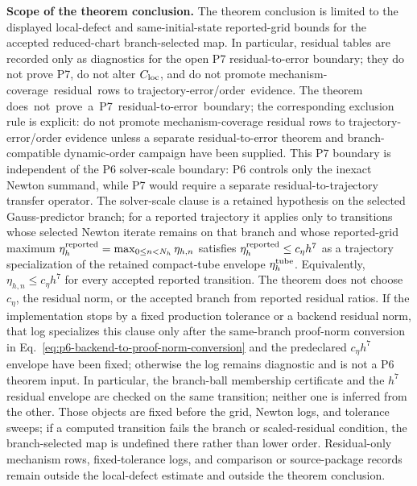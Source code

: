 \documentclass[preprint,12pt]{elsarticle}
\begin{document}
\noindent\textbf{Scope of the theorem conclusion.}
The theorem conclusion is limited to the displayed local-defect and
same-initial-state reported-grid bounds for the accepted reduced-chart
branch-selected map.
In particular, residual tables are recorded only as diagnostics for the open
P7 residual-to-error boundary; they do not
prove P7, do not alter \(C_{\rm loc}\), and do not promote
\mbox{mechanism-coverage residual rows} to \mbox{trajectory-error/order evidence}. The
theorem \mbox{does not prove a P7 residual-to-error boundary}; the
corresponding exclusion rule is explicit: do not promote
mechanism-coverage residual rows to trajectory-error/order evidence unless a
separate residual-to-error theorem and branch-compatible dynamic-order
campaign have been supplied.
This P7 boundary is independent of the P6 solver-scale boundary: P6 controls
only the inexact Newton summand, while P7 would require a separate
residual-to-trajectory transfer operator.
The solver-scale clause is a retained hypothesis on the selected Gauss-predictor
branch; for a reported trajectory it applies only to transitions whose
selected Newton iterate remains on that branch and whose reported-grid maximum
\(\eta_h^{\rm reported}=\max_{0\le n<N_h}\eta_{h,n}\) satisfies
\(\eta_h^{\rm reported}\le c_\eta h^7\) as a trajectory specialization of
the retained compact-tube envelope \(\eta_h^{\rm tube}\). Equivalently,
\(\eta_{h,n}\le c_\eta h^7\) for every accepted reported transition. The
theorem does not choose \(c_\eta\), the residual norm, or the accepted branch
from reported residual ratios.
If the implementation stops by a fixed production tolerance or a backend
residual norm, that log specializes this clause only after the
same-branch proof-norm conversion in
Eq.~\eqref{eq:p6-backend-to-proof-norm-conversion} and the
predeclared \(c_\eta h^7\) envelope have been fixed; otherwise the log
remains diagnostic and is not a P6 theorem input.
In particular, the branch-ball membership certificate and the \(h^7\)
residual envelope are checked on the same transition; neither one is inferred
from the other.
Those objects are fixed before the grid, Newton logs, and tolerance sweeps;
if a computed transition fails the branch or scaled-residual condition, the
branch-selected map is undefined there rather than lower order.
Residual-only mechanism rows, fixed-tolerance logs, and comparison or
source-package records remain outside the local-defect estimate and outside
the theorem conclusion.
\end{document}
